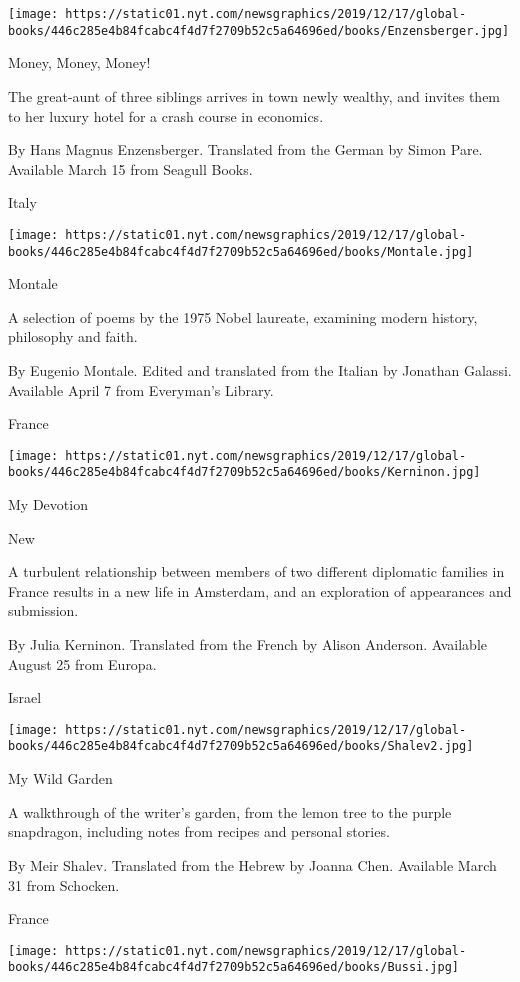 \texttt{[image: https://static01.nyt.com/newsgraphics/2019/12/17/global-books/446c285e4b84fcabc4f4d7f2709b52c5a64696ed/books/Enzensberger.jpg]}

Money, Money, Money!

The great-aunt of three siblings arrives in town newly wealthy, and
invites them to her luxury hotel for a crash course in economics.

 By Hans Magnus Enzensberger. Translated from the German by Simon Pare.
Available March 15 from Seagull Books.

Italy

\texttt{[image: https://static01.nyt.com/newsgraphics/2019/12/17/global-books/446c285e4b84fcabc4f4d7f2709b52c5a64696ed/books/Montale.jpg]}

Montale

A selection of poems by the 1975 Nobel laureate, examining modern
history, philosophy and faith.

 By Eugenio Montale. Edited and translated from the Italian by Jonathan
Galassi. Available April 7 from Everyman's Library.

France

\texttt{[image: https://static01.nyt.com/newsgraphics/2019/12/17/global-books/446c285e4b84fcabc4f4d7f2709b52c5a64696ed/books/Kerninon.jpg]}

My Devotion

New

A turbulent relationship between members of two different diplomatic
families in France results in a new life in Amsterdam, and an
exploration of appearances and submission.

 By Julia Kerninon. Translated from the French by Alison Anderson.
Available August 25 from Europa.

Israel

\texttt{[image: https://static01.nyt.com/newsgraphics/2019/12/17/global-books/446c285e4b84fcabc4f4d7f2709b52c5a64696ed/books/Shalev2.jpg]}

My Wild Garden

A walkthrough of the writer's garden, from the lemon tree to the purple
snapdragon, including notes from recipes and personal stories.

 By Meir Shalev. Translated from the Hebrew by Joanna Chen. Available
March 31 from Schocken.

France

\texttt{[image: https://static01.nyt.com/newsgraphics/2019/12/17/global-books/446c285e4b84fcabc4f4d7f2709b52c5a64696ed/books/Bussi.jpg]}

